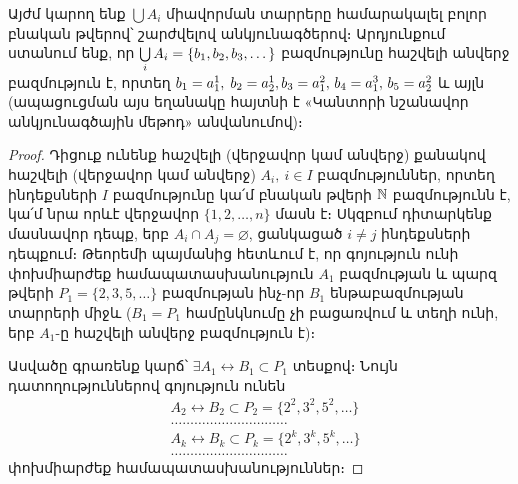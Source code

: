 \documentclass[./main.tex]{subfiles}
\begin{document}
\par Այժմ կարող ենք $\bigcup A_i$ միավորման տարրերը համարակալել բոլոր բնական թվե\-րով՝ շարժվելով անկյունագծերով։ Արդյունքում ստանում ենք, որ $\bigcup\limits_i A_i=\{b_1, b_2, \linebreak  b_3, \dots\}$ բազմությունը հաշ\-վե\-լի անվերջ բազմություն է, որտեղ $b_1=a_1^1,\; b_2=a_2^1,\linebreak  b_3=a_1^2,\, b_4=a_1^3,\, b_5=a_2^2$ և այլն (ապացուցման այս եղանակը հայտնի է «Կանտորի նշանավոր անկյունագծային մեթոդ» անվանումով)։
\renewcommand*{\proofname}{\hspace{18pt}\textbf{Թեորեմ 3-ի ապացուցումը։}\nopunct}
\begin{proof} Դիցուք ունենք հաշվելի (վերջավոր կամ անվերջ) քանակով հաշվելի (վերջավոր կամ անվերջ) $A_i,\ i\in I$ բազմություններ, որտեղ ինդեքսների $I$ բազմությունը կա՛մ բնական թվերի $\mathbb{N}$ բազմությունն է, կա՛մ նրա որևէ վերջավոր $\{1,2,\dots,n\}$ մասն է։ Սկզբում դիտարկենք մասնավոր դեպք, երբ $A_i\cap   A_j =\varnothing$, ցանկացած $i\neq j$ ինդեքսների դեպքում։ Թեորեմի պայմանից հետևում է, որ գոյություն ունի փոխմիարժեք համապատասխանություն $A_1$ բազմության և պարզ թվերի $P_1=\{2,3,5,\dots\}$ բազմության ինչ-որ $B_1$ ենթաբազմության տարրերի միջև ($B_1=P_1$ համընկնումը չի բացառվում և տեղի ունի, երբ $A_1$-ը հաշվելի անվերջ բազմություն է)։
\par
Ասվածը գրառենք կարճ՝ $\exists A_1\leftrightarrow B_1\subset P_1$ տեսքով։ Նույն դատողություններով գոյություն ունեն
\begin{align*}
&A_2 \leftrightarrow B_2 \subset P_2=\{2^2,3^2,5^2,\dots\}\\
&\dots\dots\dots\dots\dots\dots\dots\dots\dots\dots\\
&A_k\leftrightarrow B_k\subset P_k=\{2^k,3^k,5^k,\dots\}\\
&\dots\dots\dots\dots\dots\dots\dots\dots\dots\dots
\end{align*}
փոխմիարժեք համապատասխանություններ։


\end{proof}
\end{document}
